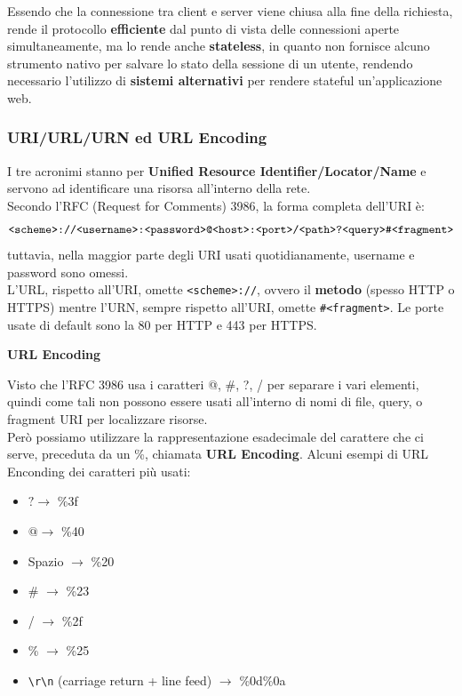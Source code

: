 \documentclass{article}
\begin{document}
Essendo che la connessione tra client e server viene chiusa alla fine della richiesta, rende il protocollo \textbf{efficiente} dal punto di vista delle connessioni aperte simultaneamente, ma lo rende anche \textbf{stateless}, in quanto non fornisce alcuno strumento nativo per salvare lo stato della sessione di un utente, rendendo necessario l’utilizzo di \textbf{sistemi alternativi} per rendere stateful un’applicazione web.

\subsubsection{URI/URL/URN ed URL Encoding}
I tre acronimi stanno per \textbf{Unified Resource Identifier/Locator/Name} e servono ad identificare una risorsa all'interno della rete.\\
Secondo l'RFC (Request for Comments) 3986, la forma completa dell'URI è:
$$
\verb|<scheme>://<username>:<password>@<host>:<port>/<path>?<query>#<fragment>|
$$
tuttavia, nella maggior parte degli URI usati quotidianamente, username e password sono omessi.\\ L'URL, rispetto all'URI, omette \verb|<scheme>://|, ovvero il \textbf{metodo} (spesso HTTP o HTTPS) mentre l'URN, sempre rispetto all'URI, omette \verb|#<fragment>|. Le porte usate di default sono la 80 per HTTP e 443 per HTTPS.

\textbf{URL Encoding}

Visto che l'RFC 3986 usa i caratteri @, \#, ?, / per separare i vari elementi, quindi come tali non possono essere usati all’interno di nomi di file, query, o fragment URI per localizzare risorse.\\ Però possiamo utilizzare la rappresentazione esadecimale del carattere che ci serve, preceduta da un \%, chiamata \textbf{URL Encoding}. Alcuni esempi di URL Enconding dei caratteri più usati:
\begin{itemize}
    \item $? \rightarrow$ \%3f
    \item $@ \rightarrow$ \%40
    \item Spazio $\rightarrow$ \%20
    \item \# $\rightarrow$ \%23
    \item  / $\rightarrow$ \%2f
    \item  \% $\rightarrow$ \%25
    \item \verb|\r\n| (carriage return + line feed) $\rightarrow$ \%0d\%0a
\end{itemize}
\end{document}
